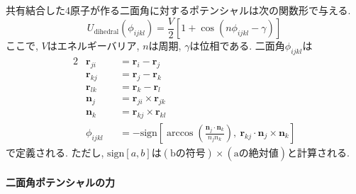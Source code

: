 共有結合した4原子が作る二面角に対するポテンシャルは次の関数形で与える. 
\begin{equation}
    U_{\mathrm{dihedral}}(\phi_{ijkl})
  =
    \frac{V}{2} [1 + \cos(n\phi_{ijkl} - \gamma)]
 \label{eq:BioModel14}
\end{equation}
ここで, $V$はエネルギーバリア, $n$は周期, $\gamma$は位相である. 二面角$\phi_{ijkl}$は
\begin{alignat}{2}
 &\bm{r}_{ji} &&= \bm{r}_{i} - \bm{r}_{j}
 \label{eq:BioModel15}
 \\
 &\bm{r}_{kj} &&= \bm{r}_{j} - \bm{r}_{k}
 \label{eq:BioModel16}
 \\
 &\bm{r}_{lk} &&= \bm{r}_{k} - \bm{r}_{l}
 \label{eq:BioModel17}
 \\
 &\bm{n}_{j}  &&= \bm{r}_{ji} \times \bm{r}_{jk}
 \label{eq:BioModel18}
 \\
 &\bm{n}_{k}  &&= \bm{r}_{kj} \times \bm{r}_{kl}
 \label{eq:BioModel19}
 \\
 &\phi_{ijkl} &&=
 - \mathrm{sign}
   \left[
         \arccos \left( \frac{\bm{n}_{j} \cdot \bm{n}_{k}}{n_{j} n_{k}}\right)
         ,~
         \bm{r}_{kj} \cdot \bm{n}_{j} \times \bm{n}_{k}
   \right]
 \label{eq:BioModel20}
\end{alignat}
で定義される. 
ただし, $\mathrm{sign}[a,b]$は$(\mathrm{bの符号}) \times (\mathrm{aの絶対値})$と計算される. 

\paragraph{二面角ポテンシャルの力} \

